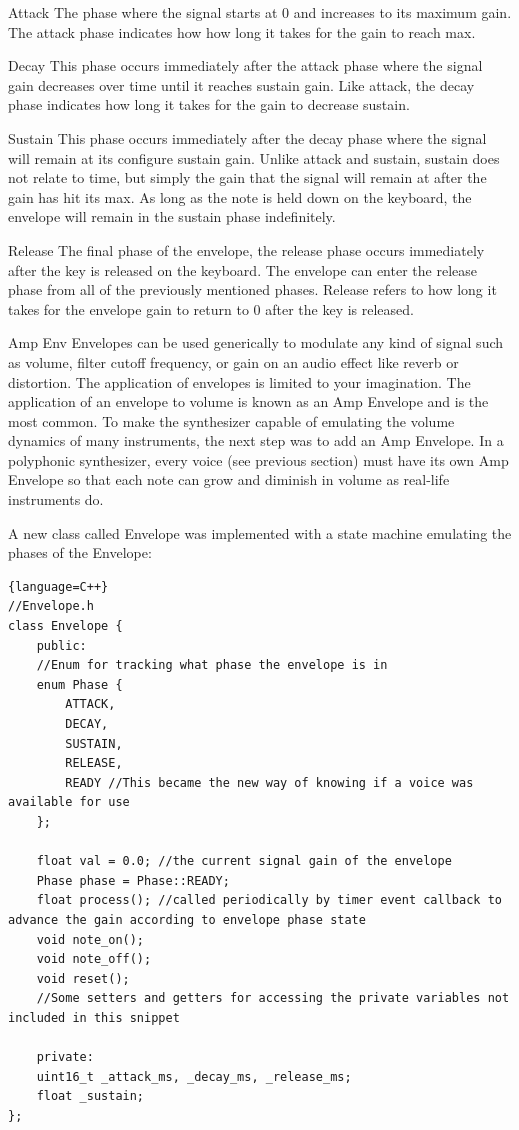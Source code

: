 \documentclass[acmlarge,screen]{acmart}
\begin{document}
Attack
The phase where the signal starts at 0 and increases to its maximum gain. The attack phase indicates how how long it takes for the gain to reach max.

Decay
This phase occurs immediately after the attack phase where the signal gain decreases over time until it reaches sustain gain. Like attack, the decay phase indicates how long it takes for the gain to decrease sustain.

Sustain
This phase occurs immediately after the decay phase where the signal will remain at its configure sustain gain. Unlike attack and sustain, sustain does not relate to time, but simply the gain that the signal will remain at after the gain has hit its max. As long as the note is held down on the keyboard, the envelope will remain in the sustain phase indefinitely.

Release
The final phase of the envelope, the release phase occurs immediately after the key is released on the keyboard. The envelope can enter the release phase from all of the previously mentioned phases. Release refers to how long it takes for the envelope gain to return to 0 after the key is released.

Amp Env
Envelopes can be used generically to modulate any kind of signal such as volume, filter cutoff frequency, or gain on an audio effect like reverb or distortion. The application of envelopes is limited to your imagination. The application of an envelope to volume is known as an Amp Envelope and is the most common. To make the synthesizer capable of emulating the volume dynamics of many instruments, the next step was to add an Amp Envelope. In a polyphonic synthesizer, every voice (see previous section) must have its own Amp Envelope so that each note can grow and diminish in volume as real-life instruments do.

A new class called Envelope was implemented with a state machine emulating the phases of the Envelope:

\begin{lstlisting}{language=C++}
//Envelope.h
class Envelope {
	public:
	//Enum for tracking what phase the envelope is in
	enum Phase {
		ATTACK,
		DECAY,
		SUSTAIN,
		RELEASE,
		READY //This became the new way of knowing if a voice was available for use
	};
	
	float val = 0.0; //the current signal gain of the envelope
	Phase phase = Phase::READY;
	float process(); //called periodically by timer event callback to advance the gain according to envelope phase state
	void note_on();
	void note_off();
	void reset();
	//Some setters and getters for accessing the private variables not included in this snippet
	
	private:
	uint16_t _attack_ms, _decay_ms, _release_ms;
	float _sustain;
};
\end{lstlisting}
\end{document}

